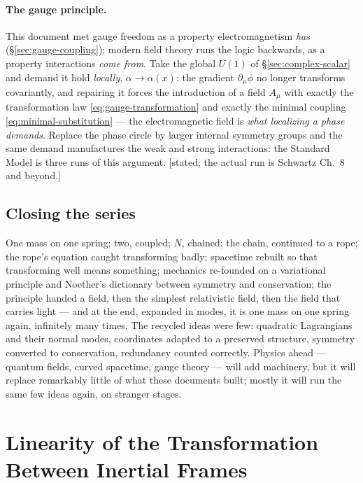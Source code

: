 \documentclass[11pt]{article}
\theoremstyle{plain}
\theoremstyle{definition}
\theoremstyle{remark}
\begin{document}
\paragraph{The gauge principle.} This document met gauge freedom as
a property electromagnetism \emph{has}
(\S\ref{sec:gauge-coupling}); modern field theory runs the logic
backwards, as a property interactions \emph{come from}. Take the
global $U(1)$ of \S\ref{sec:complex-scalar} and demand it hold
\emph{locally}, $\alpha \to \alpha(x)$: the gradient
$\partial_\mu\phi$ no longer transforms covariantly, and repairing
it forces the introduction of a field $A_\mu$ with exactly the
transformation law \eqref{eq:gauge-transformation} and exactly the
minimal coupling \eqref{eq:minimal-substitution} --- the
electromagnetic field is \emph{what localizing a phase demands}.
Replace the phase circle by larger internal symmetry groups and the
same demand manufactures the weak and strong interactions: the
Standard Model is three runs of this argument. [stated; the actual
run is Schwartz Ch.\ 8 and beyond.]

\subsection{Closing the series}
\label{sec:series-closed}

One mass on one spring; two, coupled; $N$, chained; the chain,
continued to a rope; the rope's equation caught
transforming badly; spacetime rebuilt so that transforming well means
something; mechanics re-founded on a variational principle and
Noether's dictionary between symmetry and conservation; the
principle handed a field, then the simplest relativistic field, then
the field that carries light --- and at the end, expanded in modes,
it is one mass on one spring again, infinitely many times. The
recycled ideas were few: quadratic Lagrangians and their normal
modes, coordinates adapted to a preserved structure, symmetry
converted to conservation, redundancy counted correctly. Physics
ahead --- quantum fields, curved spacetime, gauge theory --- will
add machinery, but it will replace remarkably little of what these
documents built; mostly it will run the same few ideas again, on
stranger stages.


\clearpage
\appendix

\section{Linearity of the Transformation Between Inertial Frames}
\label{app:linearity}
\end{document}
